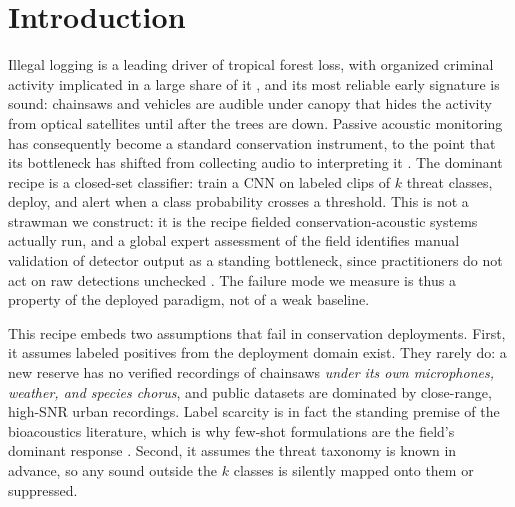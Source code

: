 \section{Introduction}

Illegal logging is a leading driver of tropical forest loss, with organized
criminal activity implicated in a large share of it \citep{nellemann2012greencarbon},
and its most reliable early signature is sound: chainsaws and vehicles are
audible under canopy that hides the activity from optical satellites until after
the trees are down. Passive acoustic monitoring has consequently become a
standard conservation instrument, to the point that its bottleneck has shifted
from collecting audio to interpreting it
\citep{stowell2022bioacoustics,malerba2026pam}. The dominant recipe is a closed-set
classifier: train a CNN on labeled clips of $k$ threat classes, deploy, and
alert when a class probability crosses a threshold. This is not a strawman we
construct: it is the recipe fielded conservation-acoustic systems actually run,
and a global expert assessment of the field identifies manual validation of
detector output as a standing bottleneck, since practitioners do not act on raw
detections unchecked \citep{malerba2026pam}. The failure mode
we measure is thus a property of the deployed paradigm, not of a weak baseline.

This recipe embeds two assumptions that fail in conservation deployments.
First, it assumes labeled positives from the deployment domain exist. They
rarely do: a new reserve has no verified recordings of chainsaws \emph{under its
own microphones, weather, and species chorus}, and public datasets are dominated
by close-range, high-SNR urban recordings. Label scarcity is in fact the standing
premise of the bioacoustics literature, which is why few-shot formulations are
the field's dominant response \citep{stowell2022bioacoustics,nolasco2023dcase}. Second, it assumes the threat
taxonomy is known in advance, so any sound outside the $k$ classes is silently
mapped onto them or suppressed.

